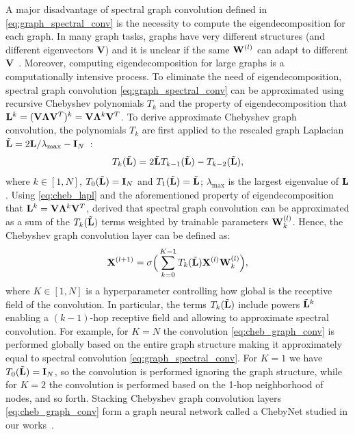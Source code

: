 A major disadvantage of spectral graph convolution defined in \eqref{eq:graph_spectral_conv} is the necessity to compute the eigendecomposition for each graph. In many graph tasks, graphs have very different structures (and different eigenvectors $\mathbf{V}$) and it is unclear if the same $\mathbf{W}^{(l)}$ can adapt to different $\mathbf{V}$~\citep{nilsson2020experimental}. 
Moreover, computing eigendecomposition for large graphs is a computationally intensive process.
To eliminate the need of eigendecomposition, %
spectral graph convolution \eqref{eq:graph_spectral_conv} can be approximated using recursive Chebyshev polynomials $T_k$ and the property of eigendecomposition that $\mathbf{L}^k=(\mathbf{V} \mathbf{\Lambda} \mathbf{V}^T)^k = \mathbf{V} \mathbf{\Lambda}^k \mathbf{V}^T$.
To derive approximate Chebyshev graph convolution, 
the polynomials $T_k$ are first applied to the rescaled graph Laplacian $\tilde{\mathbf{L}}=2\mathbf{L}/\lambda_{\max} - \mathbf{I}_N$~\citep{hammond2011wavelets, defferrard2016convolutional}:
%
\begin{equation}
\label{eq:cheb_lapl}
T_k(\tilde{\mathbf{L}}) = 2 \tilde{\mathbf{L}} T_{k-1}(\tilde{\mathbf{L}}) - T_{k-2}(\tilde{\mathbf{L}}), 
\end{equation}
%
\noindent where $k \in [1, N]$, $T_0(\tilde{\mathbf{L}}) = \mathbf{I}_N$ and $T_1(\tilde{\mathbf{L}}) = \tilde{\mathbf{L}}$; $\lambda_{\max}$ is the largest eigenvalue of $\mathbf{L}$.
Using \eqref{eq:cheb_lapl} and the aforementioned property of eigendecomposition that $\mathbf{L}^k= \mathbf{V} \mathbf{\Lambda}^k \mathbf{V}^T$, \citet{hammond2011wavelets, defferrard2016convolutional} derived that spectral graph convolution can be approximated as a sum of the $T_k(\tilde{\mathbf{L}})$ terms weighted by trainable parameters $\mathbf{W}^{(l)}_k$. Hence, the Chebyshev graph convolution layer can be defined as:
%
\begin{equation}
\label{eq:cheb_graph_conv}
\mathbf{X}^{(l+1)} = \sigma \Big(\sum^{K-1}_{k=0} T_k(\tilde{\mathbf{L}}) \mathbf{X}^{(l)} \mathbf{W}^{(l)}_k \Big),
\end{equation}
%
\noindent where $K \in [1, N]$ is a hyperparameter controlling how global is the receptive field of the convolution. In particular, the terms $T_k(\tilde{\mathbf{L}})$ include powers $\tilde{\mathbf{L}}^k$ enabling a $(k-1)$-hop receptive field and allowing to approximate spectral convolution. For example, for $K=N$ the convolution \eqref{eq:cheb_graph_conv} is performed globally based on the entire graph structure making it approximately equal to spectral convolution \eqref{eq:graph_spectral_conv}. For $K=1$ we have $T_0(\tilde{\mathbf{L}}) = \mathbf{I}_N$, so the convolution is performed ignoring the graph structure, while for $K=2$ the convolution is performed based on the 1-hop neighborhood of nodes, and so forth.
Stacking Chebyshev graph convolution layers \eqref{eq:cheb_graph_conv} form a graph neural network called a ChebyNet studied in our works~\citep{knyazev2018spectral,knyazev2019image,knyazev2019understanding}.

